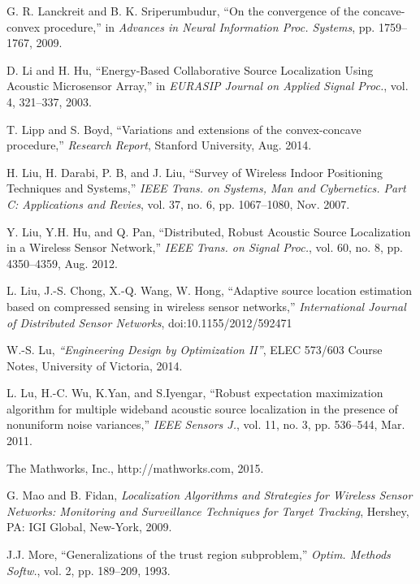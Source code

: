 \begin{thebibliography}{99}
G. R. Lanckreit and B. K. Sriperumbudur, ``On the convergence of the concave-convex procedure,'' in  {\em Advances in Neural Information Proc. Systems}, pp. 1759--1767, 2009.


 \label{r5}
D. Li and H. Hu, ``Energy-Based Collaborative Source Localization Using Acoustic Microsensor Array,'' in {\em EURASIP Journal on Applied Signal Proc.}, vol. 4, 321--337, 2003.

T. Lipp and S. Boyd, ``Variations and extensions of the convex-concave procedure,'' {\em Research Report}, Stanford University, Aug. 2014.

H. Liu, H. Darabi, P. B, and J. Liu, ``Survey of Wireless Indoor Positioning Techniques and Systems,'' {\em IEEE Trans. on Systems, Man and Cybernetics. Part C: Applications and Revies}, vol. 37, no. 6, pp. 1067--1080, Nov. 2007.

Y. Liu, Y.H. Hu, and Q. Pan, ``Distributed, Robust Acoustic Source Localization in a Wireless Sensor Network,'' {\em IEEE Trans. on Signal Proc.}, vol. 60, no. 8, pp. 4350--4359, Aug. 2012.

L. Liu, J.-S. Chong, X.-Q. Wang, W. Hong, ``Adaptive source location estimation based on compressed sensing in wireless sensor networks,'' {\em  International Journal of Distributed Sensor Networks}, doi:10.1155/2012/592471 



W.-S. Lu, {\em ``Engineering Design by Optimization II''}, ELEC 573/603 Course Notes, University of Victoria, 2014.

L. Lu, H.-C. Wu, K.Yan, and S.Iyengar, ``Robust expectation maximization algorithm for multiple wideband acoustic source localization  in  the  presence  of  nonuniform  noise  variances,'' {\em IEEE Sensors J.}, vol. 11, no. 3, pp. 536--544, Mar. 2011.

The Mathworks, Inc., http://mathworks.com, 2015.

G. Mao and B. Fidan, {\em Localization Algorithms and Strategies for Wireless Sensor Networks: Monitoring and Surveillance Techniques for Target Tracking},  Hershey, PA: IGI Global, New-York, 2009.

 \label{r11}
J.J. More, ``Generalizations of the trust region subproblem,'' {\em Optim. Methods Softw.}, vol. 2, pp. 189--209, 1993.



\end{thebibliography}
